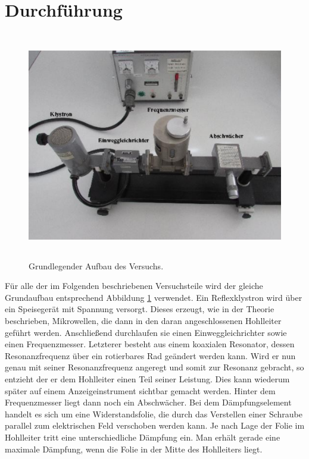 \section{Durchführung}
\label{sec:Durchführung}

\begin{figure}[H]
  \centering
  \includegraphics[height=10cm]{Grundaufbau.PNG}
  \caption{Grundlegender Aufbau des Versuchs. \cite{sample}}
  \label{fig:aufbau}
\end{figure}

Für alle der im Folgenden beschriebenen Versuchsteile wird der gleiche Grundaufbau
entsprechend Abbildung \ref{fig:aufbau} verwendet. Ein Reflexklystron wird über ein
Speisegerät mit Spannung versorgt. Dieses erzeugt, wie in der Theorie beschrieben,
Mikrowellen, die dann in den daran angeschlossenen Hohlleiter geführt werden.
Anschließend durchlaufen sie einen Einweggleichrichter sowie einen Frequenzmesser.
Letzterer besteht aus einem koaxialen Resonator, dessen Resonanzfrequenz über
ein rotierbares Rad geändert werden kann. Wird er nun genau mit seiner Resonanzfrequenz
angeregt und somit zur Resonanz gebracht, so entzieht der er dem Hohlleiter
einen Teil seiner Leistung. Dies kann wiederum später auf einem Anzeigeinstrument
sichtbar gemacht werden.
Hinter dem Frequenzmesser liegt dann noch ein Abschwächer. Bei dem Dämpfungselement
handelt es sich um eine Widerstandsfolie, die durch das Verstellen einer Schraube
parallel zum elektrischen Feld verschoben werden kann. Je nach Lage der Folie im
Hohlleiter tritt eine unterschiedliche Dämpfung ein. Man erhält gerade eine maximale
Dämpfung, wenn die Folie in der Mitte des Hohlleiters liegt.

